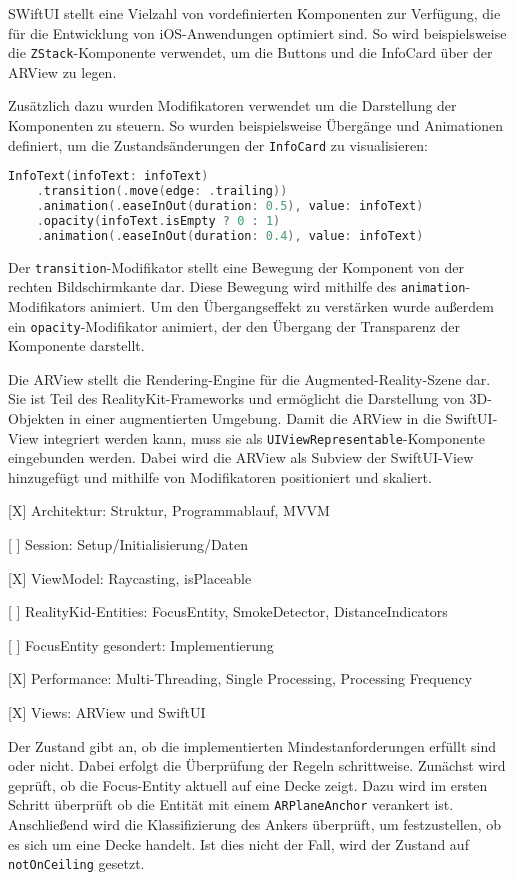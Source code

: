 SWiftUI stellt eine Vielzahl von vordefinierten Komponenten zur Verfügung, die für die Entwicklung von iOS-Anwendungen optimiert sind. So wird beispielsweise die \texttt{ZStack}-Komponente verwendet, um die Buttons und die InfoCard über der ARView zu legen. 

Zusätzlich dazu wurden Modifikatoren verwendet um die Darstellung der Komponenten zu steuern. So wurden beispielsweise Übergänge und Animationen definiert, um die Zustandsänderungen der \texttt{InfoCard} zu visualisieren:

\begin{lstlisting}[language=Swift]
InfoText(infoText: infoText)
    .transition(.move(edge: .trailing))
    .animation(.easeInOut(duration: 0.5), value: infoText)
    .opacity(infoText.isEmpty ? 0 : 1)
    .animation(.easeInOut(duration: 0.4), value: infoText)
\end{lstlisting}

Der \texttt{transition}-Modifikator stellt eine Bewegung der Komponent von der rechten Bildschirmkante dar. Diese Bewegung wird mithilfe des \texttt{animation}-Modifikators animiert. Um den Übergangseffekt zu verstärken wurde außerdem ein \texttt{opacity}-Modifikator animiert, der den Übergang der Transparenz der Komponente darstellt. 

Die ARView stellt die Rendering-Engine für die Augmented-Reality-Szene dar. Sie ist Teil des RealityKit-Frameworks und ermöglicht die Darstellung von 3D-Objekten in einer augmentierten Umgebung. Damit die ARView in die SwiftUI-View integriert werden kann, muss sie als \texttt{UIViewRepresentable}-Komponente eingebunden werden. Dabei wird die ARView als Subview der SwiftUI-View hinzugefügt und mithilfe von Modifikatoren positioniert und skaliert. 


[X] Architektur: Struktur, Programmablauf, MVVM

[ ] Session: Setup/Initialisierung/Daten

[X] ViewModel: Raycasting, isPlaceable

[ ] RealityKid-Entities: FocusEntity, SmokeDetector, DistanceIndicators

[ ] FocusEntity gesondert: Implementierung

[X] Performance: Multi-Threading, Single Processing, Processing Frequency

[X] Views: ARView und SwiftUI

Der Zustand gibt an, ob die implementierten Mindestanforderungen erfüllt sind oder nicht. Dabei erfolgt die Überprüfung der Regeln schrittweise. Zunächst wird geprüft, ob die Focus-Entity aktuell auf eine Decke zeigt. Dazu wird im ersten Schritt überprüft ob die Entität mit einem \texttt{ARPlaneAnchor} verankert ist. Anschließend wird die Klassifizierung des Ankers überprüft, um festzustellen, ob es sich um eine Decke handelt. Ist dies nicht der Fall, wird der Zustand auf \texttt{notOnCeiling} gesetzt.

